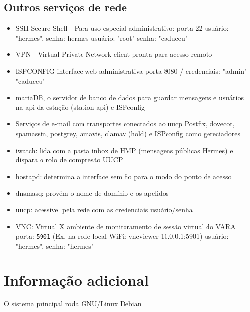 \documentclass[11pt,a4paper]{article}
\begin{document}
\subsection{Outros serviços de rede }
\label{apx_other_net}


\begin{itemize}
    \item SSH Secure Shell - Para uso especial administrativo: porta 22\newline
        \hfill usuário: "hermes", senha: hermes\newline
        \hfill usuário: "root" senha: "caduceu"
    \item VPN -  Virtual Private Network client pronta para acesso remoto
    \item ISPCONFIG interface web administrativa \newline
        \hfill porta 8080 / credenciais: "admin" "caduceu"
    \item mariaDB, o servidor de banco de dados para guardar mensagens e usuários na api da estação (station-api) e ISPconfig
    \item Serviços de e-mail com transportes conectados ao uucp
    \newline
        \hfill Postfix, dovecot, spamassin, postgrey, amavis, clamav (hold) e ISPconfig como gereciadores 
    \item iwatch: lida com a pasta inbox de HMP (mensagens públicas Hermes) e dispara o rolo de compresão UUCP
    \item hostapd: determina a interface sem fio para o modo do ponto de acesso
    \item dnsmasq: provém o nome de domínio e os apelidos 
    \item uucp: acessível pela rede com as credenciais usuário/senha%
    \item VNC: Virtual X ambiente de monitoramento de sessão virtual do VARA
        \hfill porta: \texttt{5901} (Ex. na rede local WiFi: vncviewer 10.0.0.1:5901) 
        \hfill usuário: "hermes", senha: "hermes"
\end{itemize}

\section{Informação adicional}
\label{apx_adit_info}
    O sistema principal roda GNU/Linux Debian 
\end{document}
